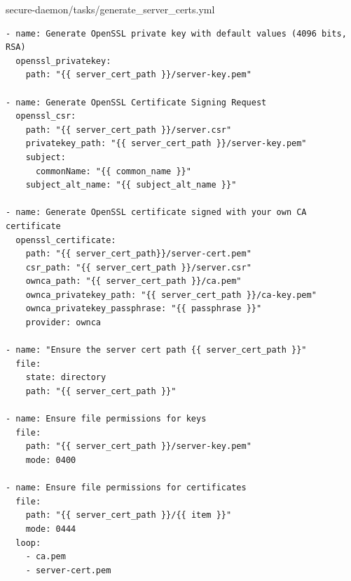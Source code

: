 secure-daemon/tasks/generate\_server\_certs.yml
\begin{verbatim}
- name: Generate OpenSSL private key with default values (4096 bits, RSA)
  openssl_privatekey:
    path: "{{ server_cert_path }}/server-key.pem"

- name: Generate OpenSSL Certificate Signing Request
  openssl_csr:
    path: "{{ server_cert_path }}/server.csr"
    privatekey_path: "{{ server_cert_path }}/server-key.pem"
    subject:
      commonName: "{{ common_name }}"
    subject_alt_name: "{{ subject_alt_name }}"

- name: Generate OpenSSL certificate signed with your own CA certificate
  openssl_certificate:
    path: "{{ server_cert_path}}/server-cert.pem"
    csr_path: "{{ server_cert_path }}/server.csr"
    ownca_path: "{{ server_cert_path }}/ca.pem"
    ownca_privatekey_path: "{{ server_cert_path }}/ca-key.pem"
    ownca_privatekey_passphrase: "{{ passphrase }}"
    provider: ownca

- name: "Ensure the server cert path {{ server_cert_path }}"
  file:
    state: directory
    path: "{{ server_cert_path }}"

- name: Ensure file permissions for keys
  file:
    path: "{{ server_cert_path }}/server-key.pem"
    mode: 0400

- name: Ensure file permissions for certificates
  file:
    path: "{{ server_cert_path }}/{{ item }}"
    mode: 0444
  loop:
    - ca.pem
    - server-cert.pem
\end{verbatim}


